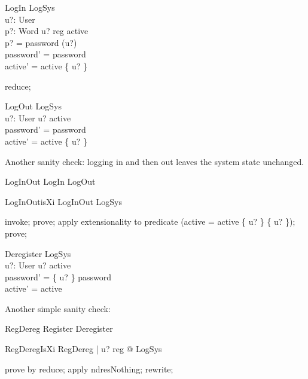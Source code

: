 \documentclass{article}
\begin{document}
\begin{schema}{LogIn}
  \Delta LogSys \\
  u?: User \\
  p?: Word
\where
  u? \in reg \setminus active \\
  p? = password (u?) \\
  password' = password \\
  active' = active \cup \{ u? \}
\end{schema}
\begin{zproof}
reduce;
\end{zproof}

\begin{schema}{LogOut}
  \Delta LogSys \\
  u?: User
\where
  u? \in active \\
  password' = password \\
  active' = active \setminus \{ u? \}
\end{schema}

Another sanity check: logging in and then out leaves the system state
unchanged.

\begin{zed}
  LogInOut  LogIn \semi LogOut
\end{zed}

\begin{theorem}{LogInOutisXi}
  LogInOut \implies \Xi LogSys
\end{theorem}

\begin{zproof}
invoke;
prove;
apply extensionality
  to predicate (active = active \cup[User] \{ u? \} \setminus \{ u? \});
prove;
\end{zproof}

\begin{schema}{Deregister}
  \Delta LogSys \\
  u?: User
\where
  u? \notin active \\
  password' = \{ u? \} \ndres password \\
  active' = active
\end{schema}

Another simple sanity check:

\begin{zed}
  RegDereg  Register \semi Deregister
\end{zed}

\begin{theorem}{RegDeregIsXi}
  \forall RegDereg | u? \notin reg @ \Xi LogSys
\end{theorem}

\begin{zproof}
prove by reduce;
apply ndresNothing;
rewrite;
\end{zproof}
\end{document}

